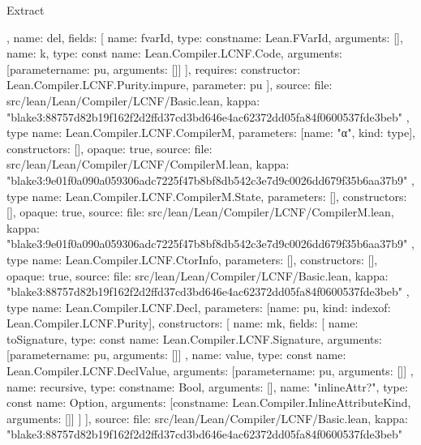 \begin{lexlean}{Extract}
\begin{toolingmodule}
{{{        },
        {
          name: del,
          fields: [
            {name: fvarId, type: const{name: Lean.FVarId, arguments: []}},
            {
              name: k,
              type: const{
                name: Lean.Compiler.LCNF.Code,
                arguments: [parameter{name: pu, arguments: []}]
              }
            }
          ],
          requires: {constructor: Lean.Compiler.LCNF.Purity.impure, parameter: pu}
        }
      ],
      source: {
        file: src/lean/Lean/Compiler/LCNF/Basic.lean,
        kappa: "blake3:88757d82b19f162f2d2ffd37cd3bd646e4ac62372dd05fa84f0600537fde3beb"
      }
    },
    type{
      name: Lean.Compiler.LCNF.CompilerM,
      parameters: [{name: "α", kind: type{}}],
      constructors: [],
      opaque: true,
      source: {
        file: src/lean/Lean/Compiler/LCNF/CompilerM.lean,
        kappa: "blake3:9e01f0a090a059306adc7225f47b8bf8db542c3e7d9c0026dd679f35b6aa37b9"
      }
    },
    type{
      name: Lean.Compiler.LCNF.CompilerM.State,
      parameters: [],
      constructors: [],
      opaque: true,
      source: {
        file: src/lean/Lean/Compiler/LCNF/CompilerM.lean,
        kappa: "blake3:9e01f0a090a059306adc7225f47b8bf8db542c3e7d9c0026dd679f35b6aa37b9"
      }
    },
    type{
      name: Lean.Compiler.LCNF.CtorInfo,
      parameters: [],
      constructors: [],
      opaque: true,
      source: {
        file: src/lean/Lean/Compiler/LCNF/Basic.lean,
        kappa: "blake3:88757d82b19f162f2d2ffd37cd3bd646e4ac62372dd05fa84f0600537fde3beb"
      }
    },
    type{
      name: Lean.Compiler.LCNF.Decl,
      parameters: [{name: pu, kind: index{of: Lean.Compiler.LCNF.Purity}}],
      constructors: [
        {
          name: mk,
          fields: [
            {
              name: toSignature,
              type: const{
                name: Lean.Compiler.LCNF.Signature,
                arguments: [parameter{name: pu, arguments: []}]
              }
            },
            {
              name: value,
              type: const{
                name: Lean.Compiler.LCNF.DeclValue,
                arguments: [parameter{name: pu, arguments: []}]
              }
            },
            {name: recursive, type: const{name: Bool, arguments: []}},
            {
              name: "inlineAttr?",
              type: const{
                name: Option,
                arguments: [const{name: Lean.Compiler.InlineAttributeKind, arguments: []}]
              }
            }
          ]
        }
      ],
      source: {
        file: src/lean/Lean/Compiler/LCNF/Basic.lean,
        kappa: "blake3:88757d82b19f162f2d2ffd37cd3bd646e4ac62372dd05fa84f0600537fde3beb"
}}}
\end{toolingmodule}
\end{lexlean}

